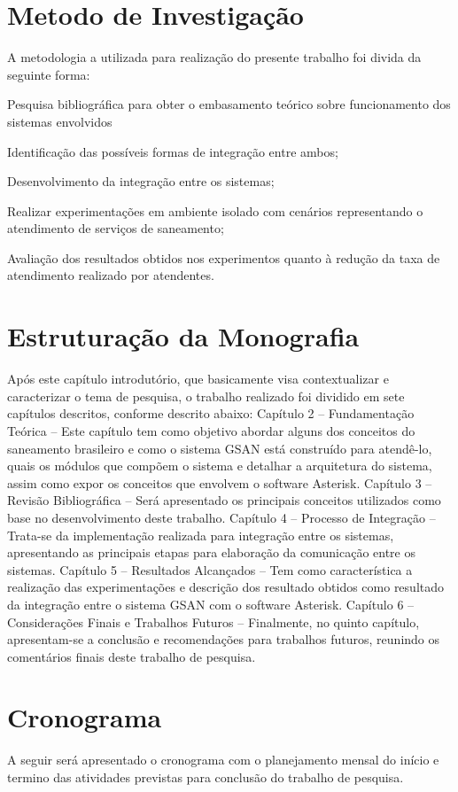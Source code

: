 \section{Metodo de Investigação}
A metodologia a utilizada para realização do presente trabalho foi divida da seguinte forma:
\begin{description}
	\item Pesquisa bibliográfica para obter o embasamento teórico sobre funcionamento dos sistemas envolvidos
	\item Identificação das possíveis formas de integração entre ambos;
	\item Desenvolvimento da integração entre os sistemas;
	\item Realizar experimentações em ambiente isolado com cenários representando o atendimento de serviços de saneamento; 
	\item Avaliação dos resultados obtidos nos experimentos quanto à redução da taxa de atendimento realizado por atendentes.
\end{description}

\section{Estruturação da Monografia}
	
Após este capítulo introdutório, que basicamente visa contextualizar e caracterizar o tema de pesquisa, o trabalho realizado foi dividido em sete capítulos descritos, conforme descrito abaixo:
Capítulo 2 – Fundamentação Teórica – Este capítulo tem como objetivo abordar alguns dos conceitos do saneamento brasileiro e como o sistema GSAN está construído para atendê-lo, quais os módulos que compõem o sistema e detalhar a arquitetura do sistema, assim como expor os conceitos que envolvem o software Asterisk.	
Capítulo 3 – Revisão Bibliográfica – Será apresentado os principais conceitos utilizados como base no desenvolvimento deste trabalho.
Capítulo  4 – Processo de Integração – Trata-se da implementação realizada para integração entre os sistemas, apresentando as principais etapas para elaboração da comunicação entre os sistemas.
Capítulo  5 – Resultados Alcançados – Tem como característica a realização das experimentações e descrição dos resultado obtidos como resultado da integração entre o sistema GSAN com o software Asterisk.
Capítulo 6 – Considerações Finais e Trabalhos Futuros – Finalmente, no quinto capítulo, apresentam-se a conclusão e recomendações para trabalhos futuros, reunindo os comentários finais deste trabalho de pesquisa.

\section*{Cronograma}
A seguir será apresentado o cronograma com o planejamento mensal do início e termino das atividades previstas para conclusão do trabalho de pesquisa.


